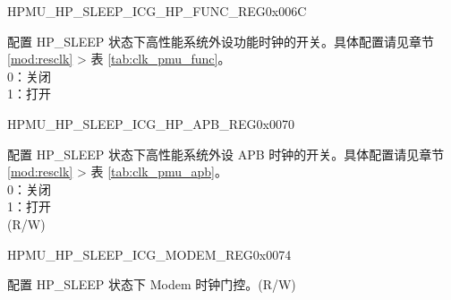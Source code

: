 \begin{register}{H}{PMU\_HP\_SLEEP\_ICG\_HP\_FUNC\_REG}{0x006C}\label{regdesc:PMUHPSLEEPICGHPFUNCREG}
%
\regnewline%
\begin{regdesc}\begin{reglist}
\label{fielddesc:PMUHPSLEEPDIGICGFUNCEN}\item [PMU\_HP\_SLEEP\_DIG\_ICG\_FUNC\_EN] 配置 HP\_SLEEP 状态下高性能系统外设功能时钟的开关。具体配置请见章节 \ref{mod:resclk} \textit{} > 表 \ref{tab:clk_pmu_func}。\\
0：关闭\\
1：打开\\
\end{reglist}\end{regdesc}
\end{register}


\begin{register}{H}{PMU\_HP\_SLEEP\_ICG\_HP\_APB\_REG}{0x0070}\label{regdesc:PMUHPSLEEPICGHPAPBREG}
%
\regnewline%
\begin{regdesc}\begin{reglist}
\label{fielddesc:PMUHPSLEEPDIGICGAPBEN}\item [PMU\_HP\_SLEEP\_DIG\_ICG\_APB\_EN] 配置 HP\_SLEEP 状态下高性能系统外设 APB 时钟的开关。具体配置请见章节 \ref{mod:resclk} \textit{} > 表 \ref{tab:clk_pmu_apb}。\\
0：关闭\\
1：打开\\
(R/W)
\end{reglist}\end{regdesc}
\end{register}


\begin{register}{H}{PMU\_HP\_SLEEP\_ICG\_MODEM\_REG}{0x0074}\label{regdesc:PMUHPSLEEPICGMODEMREG}
%
%
\regnewline%
\begin{regdesc}\begin{reglist}
\label{fielddesc:PMUHPSLEEPDIGICGMODEMCODE}\item [PMU\_HP\_SLEEP\_DIG\_ICG\_MODEM\_CODE] 配置 HP\_SLEEP 状态下 Modem 时钟门控。(R/W)
\end{reglist}\end{regdesc}
\end{register}


